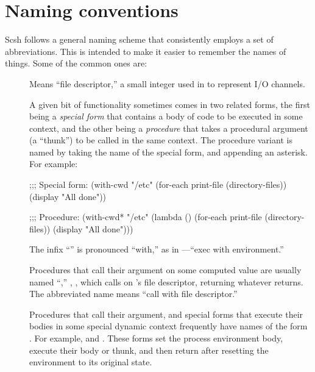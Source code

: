 \section{Naming conventions}
Scsh follows a general naming scheme that consistently employs a set of
abbreviations.
This is intended to make it easier to remember the names of things.
Some of the common ones are:
\begin{description}
\item [] 
        Means ``file descriptor,'' a small integer used in {\Unix}
        to represent I/O channels.

\item [\ex{\ldots*}]
        A given bit of functionality sometimes comes in two related forms, 
        the first being a \emph{special form} that contains a body of 
        {\Scheme} code to be executed in some context, 
        and the other being a \emph{procedure} that takes a procedural
        argument (a ``thunk'') to be called in the same context.
        The procedure variant is named by taking the name of the special form,
        and appending an asterisk. For example:
\begin{code}
;;; Special form:
(with-cwd "/etc"
  (for-each print-file (directory-files))
  (display "All done"))

;;; Procedure:
(with-cwd* "/etc"
  (lambda ()
    (for-each print-file (directory-files))
    (display "All done")))\end{code}

\item []
    The infix ``\ex{/}'' is pronounced ``with,'' as in 
    ---``exec with environment.''

\item [] 
        Procedures that call their argument on some computed value
        are usually named ``,'' \eg,
        , which calls 
        on 's file descriptor, returning whatever 
        returns. The abbreviated name means ``call with file descriptor.''

\item []
        Procedures that call their argument, and special forms that execute
        their bodies in some special dynamic context frequently have
        names of the form . For example, 
         and 
        . These forms set
        the process environment body, execute their body or thunk,
        and then return after resetting the environment to its original
        state. 


\end{description}
